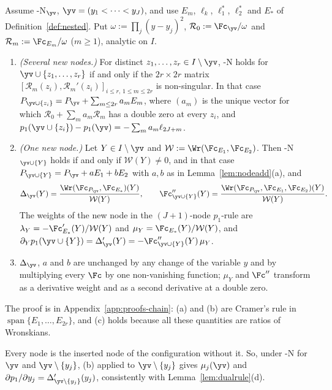 \begin{proposition}\label{prop:insertion}
Assume \hyp{N}$_{\yv}$, $\yv=(y_1<\dots<y_J)$, and use $E_m$, $\ell_k$, $\ell_1^*$, $\ell_2^*$ and $E_*$ of
Definition~\ref{def:nested}. Put $\omega:=\prod_j(y-y_j)^2$, $\mathcal R_0:=\Fc_{\yv}/\omega$ and
$\mathcal R_m:=\Fc_{E_m}/\omega$ ($m\ge1$), analytic on $I$.
\begin{enumerate}[label=(\alph*),leftmargin=2em]
\item \emph{(Several new nodes.)} For distinct $z_1,\dots,z_r\in I\setminus\yv$, \hyp{N} holds for
$\yv\cup\{z_1,\dots,z_r\}$ if and only if the $2r\times2r$ matrix
$[\mathcal R_m(z_i),\mathcal R_m'(z_i)]_{i\le r,\,1\le m\le2r}$ is non-singular. In that case
$P_{\yv\cup\{z_i\}}=P_{\yv}+\sum_{m\le2r}a_mE_m$, where $(a_m)$ is the unique vector for which
$\mathcal R_0+\sum_ma_m\mathcal R_m$ has a double zero at every $z_i$, and
$p_1(\yv\cup\{z_i\})-p_1(\yv)=-\sum_ma_m\ell_{2J+m}$.
\item \emph{(One new node.)} Let $Y\in I\setminus\yv$ and $\mathcal W:=\Wr(\Fc_{E_1},\Fc_{E_2})$. Then
\hyp{N}$_{\yv\cup\{Y\}}$ holds if and only if $\mathcal W(Y)\ne0$, and in that case $P_{\yv\cup\{Y\}}=P_{\yv}+aE_1+bE_2$
with $a,b$ as in Lemma~\ref{lem:nodeadd}(a), and
\[
\Delta_{\yv}(Y)=\frac{\Wr(\Fc_{P_{\yv}},\Fc_{E_*})(Y)}{\mathcal W(Y)},\qquad
\Fc''_{\yv\cup\{Y\}}(Y)=\frac{\Wr(\Fc_{P_{\yv}},\Fc_{E_1},\Fc_{E_2})(Y)}{\mathcal W(Y)}.
\]
The weights of the new node in the $(J+1)$-node $p_1$-rule are
$\lambda_Y=-\Fc_{E_*}'(Y)/\mathcal W(Y)$ and $\mu_Y=\Fc_{E_*}(Y)/\mathcal W(Y)$, and
$\partial_Yp_1(\yv\cup\{Y\})=\Delta_{\yv}'(Y)=-\Fc''_{\yv\cup\{Y\}}(Y)\,\mu_Y$.
\item $\Delta_{\yv}$, $a$ and $b$ are unchanged by any change of the variable $y$ and by multiplying every $\Fc$ by one
non-vanishing function; $\mu_Y$ and $\Fc''$ transform as a derivative weight and as a second derivative at a double
zero.
\end{enumerate}
\end{proposition}

The proof is in Appendix~\ref{app:proofs-chain}: (a) and (b) are Cramer's rule in
$\operatorname{span}\{E_1,\dots,E_{2r}\}$, and (c) holds because all these quantities are ratios of Wronskians.

Every node is the inserted node of the configuration without it. So, under \hyp{N} for $\yv$ and
$\yv\setminus\{y_j\}$, (b) applied to $\yv\setminus\{y_j\}$ gives $\mu_j(\yv)$ and
$\partial p_1/\partial y_j=\Delta'_{\yv\setminus\{y_j\}}(y_j)$, consistently with Lemma~\ref{lem:dualrule}(d).

